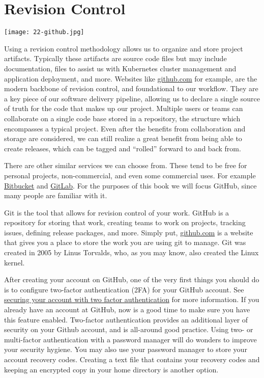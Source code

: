 \chapter{Revision Control}
\texttt{[image: 22-github.jpg]}

\justifying
Using a revision control methodology allows us to organize and store project artifacts. Typically these
artifacts are source code files but may include documentation, files to assist us with Kubernetes cluster management and application
deployment, and more. Websites like \href{https://github.com}{github.com} for example, are the modern
backbone of revision control, and foundational to our workflow. They are a key piece of our software delivery pipeline,
allowing us to declare a single source of truth for the code that makes up our project. Multiple users or teams can collaborate on a
single code base stored in a repository, the structure which encompasses a typical project. Even after the benefits from collaboration and
storage are considered, we can still realize a great benefit from being able to create releases, which can be tagged and ``rolled''
forward to and back from.

\justifying
There are other similar services we can choose from. These tend to be free for personal projects, non-commercial, and even some commercial
uses. For example \href{https://bitbucket.org/product}{Bitbucket} and \href{https://about.gitlab.com/}{GitLab}. For the purposes of this
book we will focus GitHub, since many people are familiar with it.

\justifying
Git is the tool that allows for revision control of your work. GitHub is a repository for storing that work, creating
teams to work on projects, tracking issues, defining release packages, and more. Simply put, \href{github.com}{github.com}
is a website that gives you a place to store the work you are using git to manage. Git was created in 2005 by
Linus Torvalds, who, as you may know, also created the Linux kernel.

\justifying
After creating your account on GitHub, one of the very first things you should do is to configure two-factor authentication (2FA) for your GitHub account.
See \href{https://docs.github.com/en/github/authenticating-to-github/securing-your-account-with-two-factor-authentication-2fa}{securing your account with two factor authentication}
for more information. If you already have an account at GitHub, now is a good time to make sure you have this feature enabled. Two-factor authentication provides
an additional layer of security on your Github account, and is all-around good practice. Using two- or multi-factor authentication with a
password manager will do wonders
to improve your security hygiene. You may also use your password manager to store your account recovery codes. Creating a text file
that contains your recovery codes and keeping an encrypted copy in your home directory is another option.

